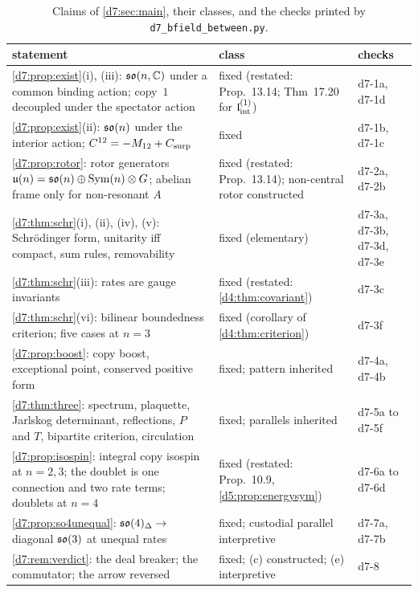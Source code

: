 \begin{table}[t]
\centering
\footnotesize
\begin{tabular}{@{}>{\raggedright\arraybackslash}p{8.1cm}>{\raggedright\arraybackslash}p{5.0cm}>{\raggedright\arraybackslash}p{2.0cm}@{}}
\toprule
statement & class & checks\\
\midrule
\cref{d7:prop:exist}(i), (iii): $\mathfrak{so}(n,\mathbb{C})$ under a common binding action; copy~$1$ decoupled under the spectator action & fixed (restated: Prop.~13.14; Thm~17.20 for $\mathfrak l_{\rm int}^{(1)}$) & d7-1a, d7-1d\\
\cref{d7:prop:exist}(ii): $\mathfrak{so}(n)$ under the interior action; $C^{12}=-M_{12}+C_{\rm surp}$ & fixed & d7-1b, d7-1c\\
\cref{d7:prop:rotor}: rotor generators $\mathfrak{u}(n)=\mathfrak{so}(n)\oplus\operatorname{Sym}(n)\otimes G$; abelian frame only for non-resonant $A$ & fixed (restated: Prop.~13.14); non-central rotor constructed & d7-2a, d7-2b\\
\cref{d7:thm:schr}(i), (ii), (iv), (v): Schr\"odinger form, unitarity iff compact, sum rules, removability & fixed (elementary) & d7-3a, d7-3b, d7-3d, d7-3e\\
\cref{d7:thm:schr}(iii): rates are gauge invariants & fixed (restated: \cref{d4:thm:covariant}) & d7-3c\\
\cref{d7:thm:schr}(vi): bilinear boundedness criterion; five cases at $n=3$ & fixed (corollary of \cref{d4:thm:criterion}) & d7-3f\\
\cref{d7:prop:boost}: copy boost, exceptional point, conserved positive form & fixed; pattern inherited & d7-4a, d7-4b\\
\cref{d7:thm:three}: spectrum, plaquette, Jarlskog determinant, reflections, $P$ and $T$, bipartite criterion, circulation & fixed; parallels inherited & d7-5a to d7-5f\\
\cref{d7:prop:isospin}: integral copy isospin at $n=2,3$; the doublet is one connection and two rate terms; doublets at $n=4$ & fixed (restated: Prop.~10.9, \cref{d5:prop:energysym}) & d7-6a to d7-6d\\
\cref{d7:prop:so4unequal}: $\mathfrak{so}(4)_\Delta\to$ diagonal $\mathfrak{so}(3)$ at unequal rates & fixed; custodial parallel interpretive & d7-7a, d7-7b\\
\cref{d7:rem:verdict}: the deal breaker; the commutator; the arrow reversed & fixed; (c) constructed; (e) interpretive & d7-8\\
\bottomrule
\end{tabular}
\caption{Claims of \cref{d7:sec:main}, their classes, and the checks printed by \texttt{d7\_bfield\_between.py}.}
\label{d7:tab:claims}
\end{table}
